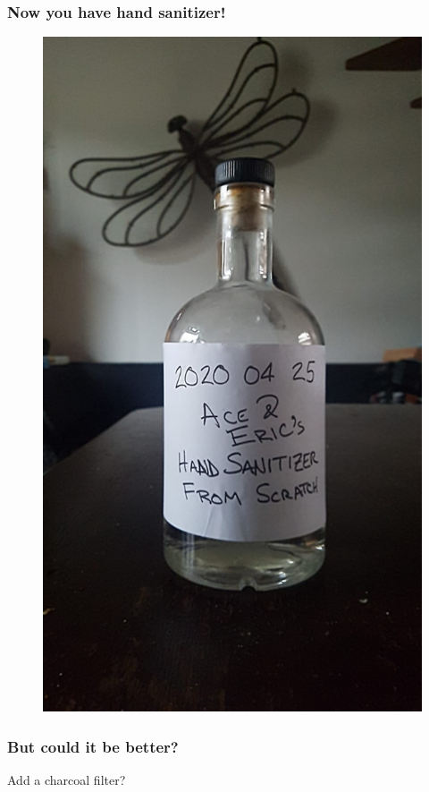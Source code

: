 \documentclass{beamer}
\begin{document}
\begin{frame}
\frametitle{Now you have hand sanitizer!}
\begin{figure}
\includegraphics[height=.7\textheight]{images/sanitizer.jpeg}
\end{figure}
\end{frame}

\begin{frame}
\frametitle{But could it be better?}
\huge{Add a charcoal filter?}
\end{frame}
\end{document}
